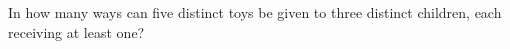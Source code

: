 In how many ways can five distinct toys be given to three distinct children, each receiving at least one?
